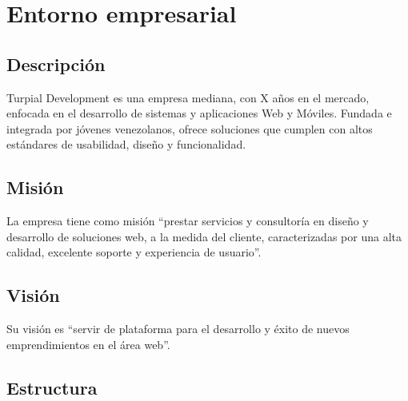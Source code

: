 \chapter{\textbf{Entorno empresarial}}

\thispagestyle{empty}

\section{Descripción}

Turpial Development es una empresa mediana, con X años en el mercado, enfocada en el desarrollo de sistemas y aplicaciones Web y Móviles. Fundada e integrada por jóvenes venezolanos, ofrece soluciones que cumplen con altos estándares de usabilidad, diseño y funcionalidad.

\section{Misión}

La empresa tiene como misión “prestar servicios y consultoría en diseño y desarrollo de soluciones web, a la medida del cliente, caracterizadas por una alta calidad, excelente soporte y experiencia de usuario”.

\section{Visión}

Su visión es “servir de plataforma para el desarrollo y éxito de nuevos emprendimientos en el área web”.

\section{Estructura}
